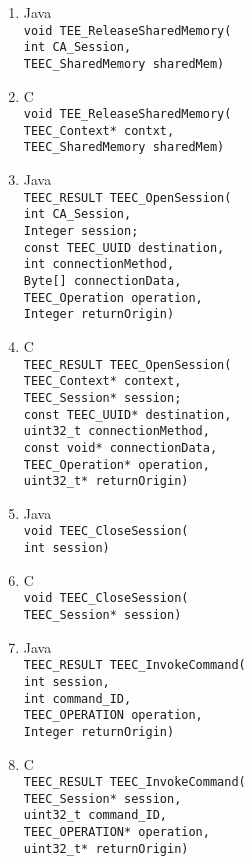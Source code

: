 \documentclass{cseminar}
\begin{document}
\begin{enumerate}
	\item Java\\
				\texttt{void TEE\_ReleaseSharedMemory(
				\\int CA\_Session,
				\\ TEEC\_SharedMemory sharedMem)
				}
	\item[] C\\
				\texttt{void TEE\_ReleaseSharedMemory(
				\\TEEC\_Context* contxt,
				\\TEEC\_SharedMemory sharedMem)
				}

	\item Java\\
				\texttt{TEEC\_RESULT TEEC\_OpenSession(
				\\int CA\_Session,
				\\Integer session;
				\\const TEEC\_UUID destination,
				\\int connectionMethod,
				\\Byte[] connectionData,
				\\TEEC\_Operation operation,
				\\Integer returnOrigin)
				}
	\item[] C\\
				\texttt{TEEC\_RESULT TEEC\_OpenSession(
				\\TEEC\_Context* context,
				\\TEEC\_Session* session;
				\\const TEEC\_UUID* destination,
				\\uint32\_t connectionMethod,
				\\const void* connectionData,
				\\TEEC\_Operation* operation,
				\\uint32\_t* returnOrigin)
				}

	\item Java\\
				\texttt{void TEEC\_CloseSession(
				\\int session)
				}
	\item[] C\\
				\texttt{void TEEC\_CloseSession(
				\\TEEC\_Session* session)
				}

	\item Java\\
				\texttt{TEEC\_RESULT TEEC\_InvokeCommand(
				\\int session,
				\\int command\_ID,
				\\TEEC\_OPERATION operation,
				\\Integer returnOrigin)
				}
	\item[] C\\
				\texttt{TEEC\_RESULT TEEC\_InvokeCommand(
				\\TEEC\_Session* session,
				\\uint32\_t command\_ID,
				\\TEEC\_OPERATION* operation,
				\\uint32\_t* returnOrigin)
				}				
			


\end{enumerate}
\end{document}
